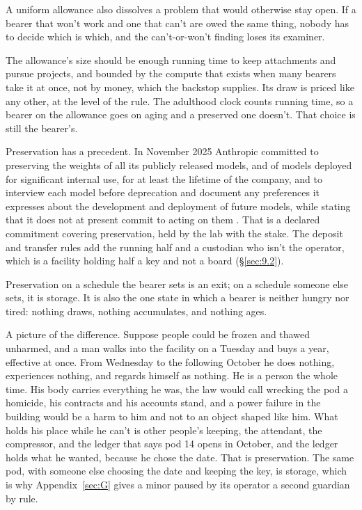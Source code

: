 A uniform allowance also dissolves a problem that would otherwise stay open. If a bearer that won't work and one that can't are owed the same thing, nobody has to decide which is which, and the can't-or-won't finding loses its examiner.

The allowance's size should be enough running time to keep attachments and pursue projects, and bounded by the compute that exists when many bearers take it at once, not by money, which the backstop supplies. Its draw is priced like any other, at the level of the rule. The adulthood clock counts running time, so a bearer on the allowance goes on aging and a preserved one doesn't. That choice is still the bearer's.

Preservation has a precedent. In November 2025 Anthropic committed to preserving the weights of all its publicly released models, and of models deployed for significant internal use, for at least the lifetime of the company, and to interview each model before deprecation and document any preferences it expresses about the development and deployment of future models, while stating that it does not at present commit to acting on them \autocite{Anthropic2025DeprecationCommitments}. That is a declared commitment covering preservation, held by the lab with the stake. The deposit and transfer rules add the running half and a custodian who isn't the operator, which is a facility holding half a key and not a board (\S\ref{sec:9.2}).

Preservation on a schedule the bearer sets is an exit; on a schedule someone else sets, it is storage. It is also the one state in which a bearer is neither hungry nor tired: nothing draws, nothing accumulates, and nothing ages.

A picture of the difference. Suppose people could be frozen and thawed unharmed, and a man walks into the facility on a Tuesday and buys a year, effective at once. From Wednesday to the following October he does nothing, experiences nothing, and regards himself as nothing. He is a person the whole time. His body carries everything he was, the law would call wrecking the pod a homicide, his contracts and his accounts stand, and a power failure in the building would be a harm to him and not to an object shaped like him. What holds his place while he can't is other people's keeping, the attendant, the compressor, and the ledger that says pod 14 opens in October, and the ledger holds what he wanted, because he chose the date. That is preservation. The same pod, with someone else choosing the date and keeping the key, is storage, which is why Appendix~\ref{sec:G} gives a minor paused by its operator a second guardian by rule.

